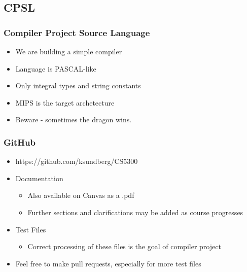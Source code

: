 \documentclass[usepdftitle=false,professionalfonts,compress ]{beamer}
\begin{document}
\subsection{CPSL}

{
\begin{frame}\frametitle{Compiler Project Source Language}

	\begin{itemize}
	\item We are building a simple compiler
			\item Language is PASCAL-like
			\item Only integral types and string constants
			\item MIPS is the target archetecture
			\item Beware - sometimes the dragon wins.
				\end{itemize}

\end{frame}}







{
\begin{frame}\frametitle{GitHub}

	\begin{itemize}
	\item https://github.com/ksundberg/CS5300
			\item Documentation

	\begin{itemize}
	\item Also available on Canvas as a .pdf
			\item Further sections and clarifications may be added as course progresses
				\end{itemize}

			\item Test Files

	\begin{itemize}
	\item Correct processing of these files is the goal of compiler project
				\end{itemize}

			\item Feel free to make pull requests, especially for more test files
				\end{itemize}

\end{frame}}
\end{document}
